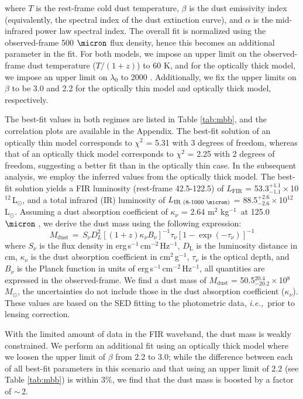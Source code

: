 \documentclass[twocolumn,apj,numberedappendix]{emulateapj}
\newcommand{\Msun}{\mbox{$M_{\odot}$}}
\newcommand{\Lsun}{\mbox{L$_{\odot}$}}
\newcommand{\ie}{{\sl i.e.,~}}
\newcommand{\pmOne}{\mbox{$^{-1}$}}
\begin{document}
where $T$ is the rest-frame cold dust temperature, $\beta$ is the dust emissivity index (equivalently, the spectral index of the dust extinction
curve), and $\alpha$ is the mid-infrared power law spectral index. The overall fit is normalized using the observed-frame 500
$\micron$ flux density, hence this becomes an additional parameter in the fit. For both models, we impose an upper limit on the observed-frame dust temperature ($T/(1+z)$) to 60 K, and for the optically thick model, we impose an upper limit on $\lambda_0$ to 2000\,\,\micron. Additionally, we fix the upper limits on 
$\beta$ to be 3.0 and 2.2 for the optically thin model and optically thick model, respectively.


The best-fit values in both regimes are listed in Table \ref{tab:mbb}, and the correlation plots are available in the Appendix. The best-fit solution of an optically thin
model corresponds to $\chi^2$ = 5.31 with 3 degrees of freedom, whereas that of an optically thick model
corresponds to $\chi^2$ = 2.25 with 2 degrees of freedom, suggesting a better fit than in the optically thin
case. In the subsequent analysis, we employ the inferred values from the optically thick model.
The best-fit solution yields a FIR luminosity (rest-frame 42.5-122.5\micron) of $L_\textrm{FIR}$ = 53.3$^{+1.1}_{-1.1}$\,$\times$\,10$^{12}$\,\Lsun, and a total infrared (IR) luminosity of $L_\textrm{IR (8-1000 \micron)}$ = 88.5$^{+2.6}_{-2.6}$\,$\times$\,10$
^{12}$\,\Lsun. Assuming a dust absorption coefficient of $\kappa_{\nu}$ = 2.64\,\,m$^2$\,\,kg\pmOne\ at 125.0\,\,$
\micron$ \citep{Dunne03a}, we derive the dust mass using the following expression:
\begin{equation}
M_\textrm{dust}\,=\,S_{\nu} D_{L}^2 [(1 + z) \kappa_{\nu} B_{\nu}]^{-1} \tau_{\nu} [1-
\exp(-\tau_{\nu})]^{-1}
\end{equation}
where $S_{\nu}$ is the flux density in erg\,s\pmOne\,cm$^{-2}$\,Hz\pmOne, $D_\textrm{L}$ is the luminosity distance in cm, $\kappa_{\nu}$ is the dust
absorption coefficient in cm$^2$\,g\pmOne, $\tau_{\nu}$ is the optical depth, and $B_{\nu}$ is the Planck function in units of erg\,s\pmOne\,cm$^{-2}$\,Hz\pmOne,
all quantities are expressed in the observed-frame. We find a dust mass of $M_\textrm{dust}$ = 50.5$^{20.4}_{-20.2}\times$10$^8$\,\,\Msun, the uncertainties do not include those in the dust absorption coefficient ($\kappa_{\nu}$). These values are based on the SED fitting to the photometric data, \ie prior
to lensing correction. 

With the limited amount of data in the FIR waveband, the dust mass is weakly constrained. 
We perform an additional fit using an optically thick model where we loosen the upper limit of $\beta$ from 2.2 to 3.0; while the difference between each of all best-fit parameters in this scenario and that using an upper limit of 2.2 (see Table \ref{tab:mbb}) is within 3\%, we find that the dust mass is boosted by a factor of $\sim$\,2. 
\end{document}
